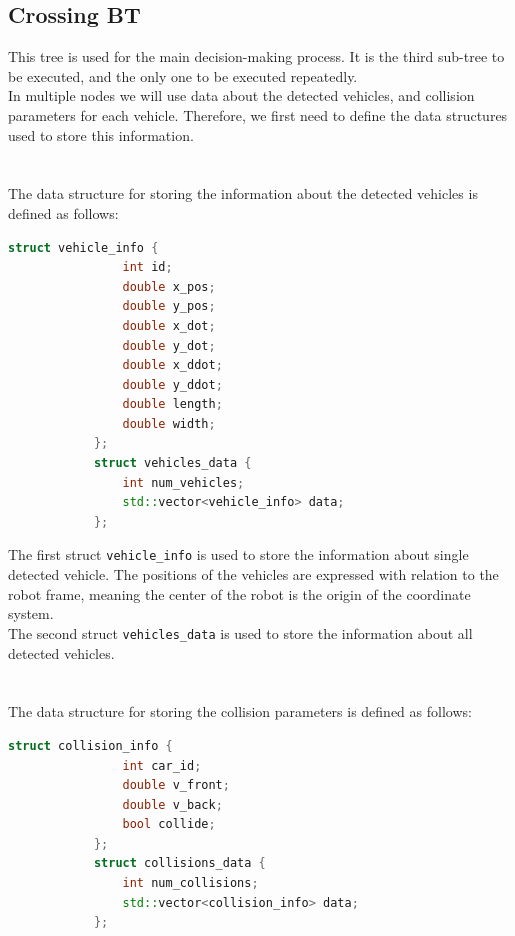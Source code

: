 \subsection{Crossing BT}
\label{sec:Crossing-BT-impl}
    This tree is used for the main decision-making process. It is the third sub-tree to be executed, and the only one to be executed repeatedly.\\
    In multiple nodes we will use data about the detected vehicles, and collision parameters for each vehicle. Therefore, we first need to define the data structures used to store this information.\\\\
    \\
        The data structure for storing the information about the detected vehicles is defined as follows:
        \begin{lstlisting}[language=C++, caption={Vehicle data structure}, label={lst:vehicle_data}]
            struct vehicle_info {
                int id;
                double x_pos;
                double y_pos;
                double x_dot;
                double y_dot;
                double x_ddot;
                double y_ddot;
                double length;
                double width;
            };
            struct vehicles_data {
                int num_vehicles;
                std::vector<vehicle_info> data;
            };
        \end{lstlisting}
        The first struct \texttt{vehicle\_info} is used to store the information about single detected vehicle. The positions of the vehicles are expressed with relation to the robot frame, meaning the center of the robot is the origin of the coordinate system.\\
        The second struct \texttt{vehicles\_data} is used to store the information about all detected vehicles.\\\\
    \\
        The data structure for storing the collision parameters is defined as follows:
        \begin{lstlisting}[language=C++, caption={Collision data structure}, label={lst:collision_data}]
            struct collision_info {
                int car_id;
                double v_front;
                double v_back;
                bool collide;
            };
            struct collisions_data {
                int num_collisions;
                std::vector<collision_info> data;
            };
        \end{lstlisting}
